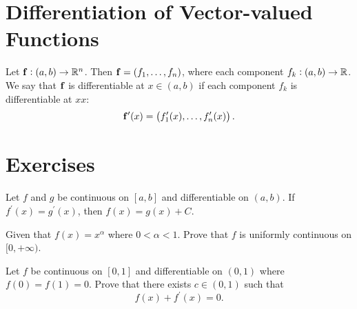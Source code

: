 \begin{comment}
We'll be talking about the one given in the book, known as the Lagrange form:
:
Given that f is n times differentiable on $(a,b)$ such that $f^{(n-1)}$ is continuous on $[a,b]$, then
\[ f(x)=f(a)+\frac{f^\prime(a)}{1!}(x-a)+\frac{f^{\prime\prime}(a)}{2!}(x-a)^2+\cdots+\frac{f^{(n-1)}(a)}{(n-1)!}(x-a)^(n-1)+\frac{f^{(n)}(\xi)}{n!}(x-a)^n \]

Fix any $x\in(a,b)$, then we construct the functions
\[ F(t)=f(x)-\brac{f(t)+\frac{f^\prime(t)}{1!}(x-t)+\frac{f^{\prime\prime}(t)}{2!}(x-t)^2+\cdots+\frac{f^{(n-1)}(t)}{(n-1)!}(x-t)^{n-1}} \]
\[ G(t)=(x-t)^n \]

We calculate $F^\prime(t)$ as follows:
\[ -[f^\prime(t)+\frac{f^{\prime\prime}(t)}{1!}-f^\prime(t)+\frac{f^{\prime\prime\prime}(t)}{2!}-\frac{f^{\prime\prime}(t)}{1!}+\cdots+\frac{f^{(n)}(t)}{(n-1)!}(x-t)^{n-1}-\frac{f^{(n-1)}(t)}{(n-2)!}(x-t)^{n-2}]=-\frac{f^{(n)}(t)}{(n-1)!}(x-t)^{n-1} \]

$G^\prime(t)=-n(x-t)^{n-1}$, so we have
\[ \frac{F^\prime(t)}{G^\prime(t)}=\frac{f^{(n)}(t)}{n!} \]

The main reason for why we come up with the strange-looking $F$ and $G$ is that we specifically swap out $a$ for $t$ so that $F(x)=G(x)=0$, in hopes of getting rid of $x$:

We apply Cauchy's MVT to $F$ and $G$ on $[a,x]$, so that we obtain $\xi\in(a,x)$ satisfying
\[ \frac{F^\prime(\xi)}{G^\prime(\xi)}=\frac{F(x)-F(a)}{G(x)-G(a)}=\frac{F(a)}{G(a)}. \]
Thus the Lagrange form of the remainder is given by 
\[ F(a)=\frac{f^{(n)}(\xi)}{n!}G(a). \]
\end{comment}
\pagebreak

\section{Differentiation of Vector-valued Functions}
Let $\vb{f}:(a,b)\to\mathbb R^n$. Then $\vb{f}=(f_1,\dots,f_n)$, where each component $f_k:(a,b)\to\mathbb R$. We say that $\vb{f}$ is differentiable at $x\in(a,b)$ if each component $f_k$ is differentiable at $xx$:
\[\vb{f}^\prime(x)=\left(f_1^\prime(x),\dots,f_n^\prime(x)\right).\]

\pagebreak

\section*{Exercises}
\begin{exercise}
Let $f$ and $g$ be continuous on $[a,b]$ and differentiable on $(a,b)$. If $f^\prime(x)=g^\prime(x)$, then $f(x)=g(x)+C$.
\end{exercise}

\begin{exercise}
Given that $f(x)=x^\alpha$ where $0<\alpha<1$. Prove that $f$ is uniformly continuous on $[0,+\infty)$.
\end{exercise}

\begin{exercise}
Let $f$ be continuous on $[0,1]$ and differentiable on $(0,1)$ where $f(0)=f(1)=0$. Prove that there exists $c\in(0,1)$ such that
\[ f(x)+f^\prime(x)=0. \]
\end{exercise}